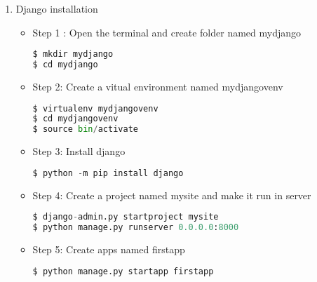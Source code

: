 


\newcommand{\noncopynumber}[1]{
	\BeginAccSupp{method=escape,ActualText={}}
	#1
	\EndAccSupp{}
}


\lstset{style=mystyle}
\begin{enumerate}
	\item Django installation
\begin{itemize}
	\item Step 1 :
	Open the terminal and create folder named mydjango
\begin{lstlisting}[language=python]
$ mkdir mydjango
$ cd mydjango

\end{lstlisting}
\item Step 2:
Create a vitual environment named mydjangovenv
\begin{lstlisting}[language=python]
$ virtualenv mydjangovenv
$ cd mydjangovenv
$ source bin/activate

\end{lstlisting}
\item Step 3:
Install django

\begin{lstlisting}[language=python]
$ python -m pip install django

\end{lstlisting}
\item Step 4:
Create a project named mysite and make it run in server

\begin{lstlisting}[language=python]
$ django-admin.py startproject mysite
$ python manage.py runserver 0.0.0.0:8000

\end{lstlisting}

\item Step 5:
Create apps named firstapp

\begin{lstlisting}[language=python]
$ python manage.py startapp firstapp

\end{lstlisting}
\end{itemize}
\end{enumerate}